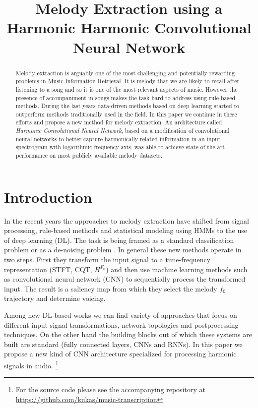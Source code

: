 \documentclass{article}
\title{Melody Extraction using a Harmonic Harmonic Convolutional Neural Network}
\begin{document}
%
\maketitle
%
\begin{abstract}
Melody extraction is arguably one of the most challenging and potentially rewarding problems in Music Information Retrieval. It is melody that we are likely to recall after listening to a song and so it is one of the most relevant aspects of music. However the presence of accompaniment in songs makes the task hard to address using rule-based methods. During the last years data-driven methods based on deep learning started to outperform methods traditionally used in the field. In this paper we continue in these efforts and propose a new method for melody extraction. An architecture called \emph{Harmonic Convolutional Neural Network}, based on a modification of convolutional neural networks to better capture harmonically related information in an input spectrogram with logarithmic frequency axis, was able to achieve state-of-the-art performance on most publicly available melody datasets.
\end{abstract}
%
\section{Introduction}\label{sec:introduction}

In the recent years the approaches to melody extraction have shifted from signal processing, rule-based methods and statistical modeling using HMMs \cite{Salamon2014} to the use of deep learning (DL). The task is being framed as a standard classification problem \cite{Poliner,Kum2016,Rigaud2016,Balke2017,DBasaranSEssid2018} or as a de-noising problem \cite{Bittner2017}. In general these new methods operate in two steps. First they transform the input signal to a time-frequency representation (STFT, CQT, $H^{F_0}$) and then use machine learning methods such as convolutional neural network (CNN) to sequentially process the transformed input. The result is a saliency map from which they select the melody $f_0$ trajectory and determine voicing.

Among new DL-based works we can find variety of approaches that focus on different input signal transformations, network topologies and postprocessing techniques. On the other hand the building blocks out of which these systems are built are standard (fully connected layers, CNNs and RNNs). In this paper we propose a new kind of CNN architecture specialized for processing harmonic signals in audio. %
\footnote{For the source code please see the accompanying repository at \url{https://github.com/kukas/music-transcription}}
\end{document}

